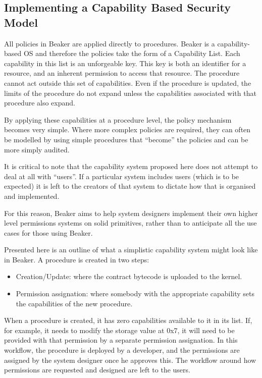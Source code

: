 \documentclass[english,a4paper]{article}
\begin{document}
\subsection{Implementing a Capability Based Security
Model}\label{implementing-a-capability-based-security-model}
All policies in Beaker are applied directly to procedures. Beaker is a
capability-based OS and therefore the policies take the form of a
Capability List. Each capability in this list is an unforgeable key.
This key is both an identifier for a resource, and an inherent
permission to access that resource. The procedure cannot act outside
this set of capabilities. Even if the procedure is updated, the limits
of the procedure do not expand unless the capabilities associated with
that procedure also expand.

By applying these capabilities at a procedure level, the policy
mechanism becomes very simple. Where more complex policies are required,
they can often be modelled by using simple procedures that ``become''
the policies and can be more simply audited.

It is critical to note that the capability system proposed here does not
attempt to deal at all with ``users''. If a particular system includes
users (which is to be expected) it is left to the creators of that
system to dictate how that is organised and implemented.

For this reason, Beaker aims to help system designers implement their
own higher level permissions systems on solid primitives, rather than to
anticipate all the use cases for those using Beaker.

Presented here is an outline of what a simplistic capability system
might look like in Beaker. A procedure is created in two steps:

\begin{itemize}
\item
  Creation/Update: where the contract bytecode is uploaded to the
  kernel.
\item
  Permission assignation: where somebody with the appropriate capability
  sets the capabilities of the new procedure.
\end{itemize}

When a procedure is created, it has zero capabilities available to it in
its list. If, for example, it needs to modify the storage value at 0x7,
it will need to be provided with that permission by a separate
permission assignation. In this workflow, the procedure is deployed by a
developer, and the permissions are assigned by the system designer once
he approves this. The workflow around how permissions are requested and
designed are left to the users.
\end{document}
